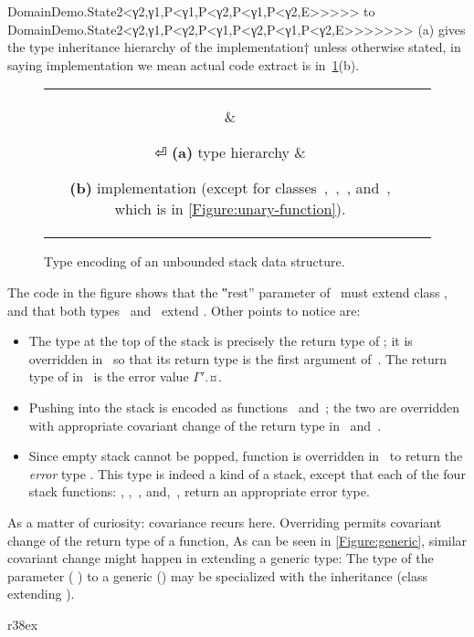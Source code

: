 DomainDemo.State2<γ2,γ1,P<γ1,P<γ2,P<γ1,P<γ2,E>>>>> to 
DomainDemo.State2<γ2,γ1,P<γ2,P<γ1,P<γ2,P<γ1,P<γ2,E>>>>>>>
(a) gives the type inheritance hierarchy of the \Java
implementation†{%
  unless otherwise stated, in saying implementation we mean actual
  code extract
}
is in~\cref{Figure:stack-encoding}(b).

\begin{figure}[H]
  \caption{Type encoding of an unbounded stack data structure.}
  \label{Figure:stack-encoding} 
  \begin{tabular}{cc}
    \parbox[c]{0.3\linewidth}{%
      
    } &
    \hspace{-3ex} \parbox[c]{63ex}{}⏎
    \textbf{(a)} type hierarchy                                            &
    \hspace{-3ex} \parbox[t]{63ex}{%
    \textbf{(b)} implementation (except
    for classes~,~,~, and~, which is in \cref{Figure:unary-function}).}
  \end{tabular}
\end{figure}

The code in the figure shows that the ‟rest” parameter of~ must extend class ,
  and that both types~ and~ extend .
Other points to notice are:
\begin{itemize}
  \item The type at the top of the stack is precisely the return type of ;
        it is overridden in~ so that its return type is the first argument of~.
        The return type of  in~ is the error value {$Γ'$.¤}.
  \item Pushing into the stack is encoded as functions~ and~;
        the two are overridden with appropriate covariant change of the return type in~ and~.

  \item Since empty stack cannot be popped, function  is overridden in~ to return
    the \emph{error} type . This type is indeed a kind of a stack, except that each of the four stack
        functions: , ,~, and,~, return an appropriate error type.
\end{itemize}

As a matter of curiosity: covariance recurs here.
Overriding permits covariant change of the return type of a function,
As can be seen in \cref{Figure:generic}, similar covariant change might happen in extending a generic type: 
The type of the parameter ( ) to a generic () may 
be specialized with the inheritance (class  extending ). 
\begin{wrapfigure}[5]r{38ex}
  \caption{\label{Figure:generic} Covariance with generics}
\end{wrapfigure}

